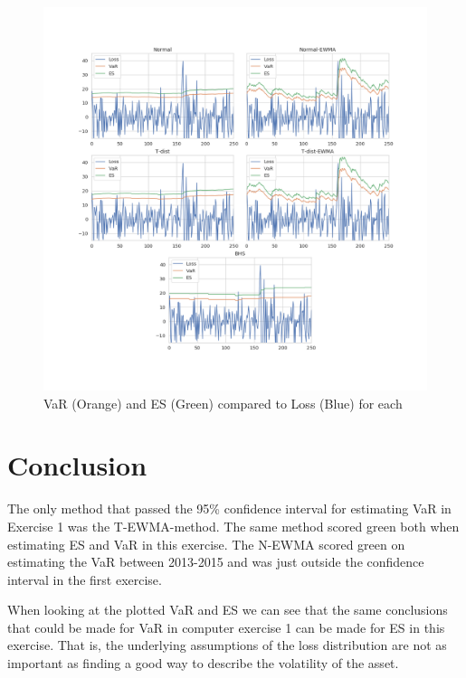 \documentclass[a4paper]{article}
\begin{document}
\begin{figure}[h]
    \includegraphics[width=\textwidth]{plot.png}
    \caption{VaR (Orange) and ES (Green) compared to Loss (Blue) for each}
    \label{var2}
\end{figure}

\section{Conclusion}
The only method that passed the 95\% confidence interval for estimating VaR in Exercise 1 was the T-EWMA-method. The same method scored green both when estimating ES and VaR in this exercise. The N-EWMA scored green on estimating the VaR between 2013-2015 and was just outside the confidence interval in the first exercise. 

When looking at the plotted VaR and ES we can see that the same conclusions that could be made for VaR in computer exercise 1 can be made for ES in this exercise. That is, the underlying assumptions of the loss distribution are not as important as finding a good way to describe the volatility of the asset. 
\end{document}
